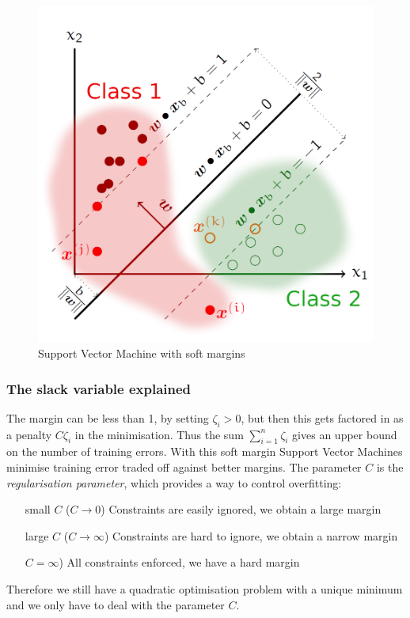 \documentclass[a4paper, 11pt]{article}
\begin{document}
\begin{figure}
	\centering
	\includegraphics[keepaspectratio,width=0.4\linewidth]{Pictures/soft_margin_svm}
	\caption{Support Vector Machine with soft margins}
	\label{fig:svm_softmargins}
\end{figure}

\subsubsection{The slack variable explained}

The margin can be less than 1, by setting $\zeta_i > 0$, but then this gets factored in as a penalty $C\zeta_i$ in the minimisation. Thus the sum $\sum_{i=1}^{n}\zeta_i$ gives an upper bound on the number of training errors. With this soft margin Support Vector Machines minimise training error traded off against better margins. The parameter $C$ is the \textit{regularisation parameter}, which provides a way to control overfitting:

\begin{itemize}[leftmargin=*, labelindent=5cm, labelsep=0.5cm]
	\item[small $C$ ($C \rightarrow 0$)] Constraints are easily ignored, we obtain a large margin
	\item[large $C$ ($C \rightarrow \infty$)] Constraints are hard to ignore, we obtain a narrow margin
	\item[$C = \infty$)] All constraints enforced, we have a hard margin
\end{itemize}

Therefore we still have a quadratic optimisation problem with a unique minimum and we only have to deal with the parameter $C$.
\end{document}
